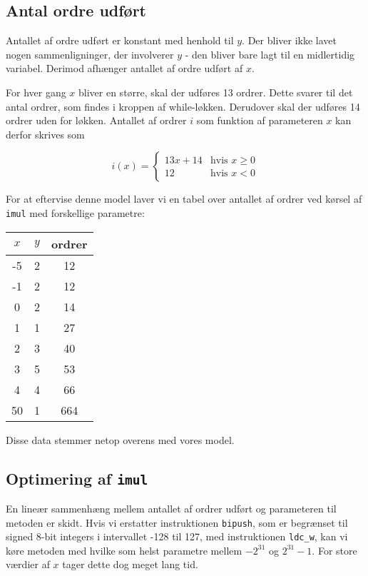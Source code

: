 \documentclass[12pt,a4paper]{article}
\newcommand{\imul}{\texttt{imul}}
\begin{document}
\subsection{Antal ordre udført}
Antallet af ordre udført er konstant med henhold til $y$. Der bliver ikke lavet
nogen sammenligninger, der involverer $y$ - den bliver bare lagt til en
midlertidig variabel. Derimod afhænger antallet af ordre udført af $x$.

For hver gang $x$ bliver en større, skal der udføres 13 ordrer. Dette
svarer til det antal ordrer, som findes i kroppen af while-løkken.
Derudover skal der udføres 14 ordrer uden for løkken.
Antallet af ordrer $i$ som funktion af parameteren $x$ kan derfor
skrives som

\[i(x)=\left\{\begin{array}{cc}
	13x + 14 & \text{hvis }x\geq0 \\
	12 & \text{hvis }x<0
\end{array}\right.\]


For at eftervise denne model laver vi en tabel over antallet af ordrer
ved kørsel af \imul{} med forskellige parametre:

\begin{tabular}{|c|c|c|}
\hline
$x$ & $y$ & ordrer \\ \hline
-5  & 2  &  12 \\ \hline
-1  & 2  &  12 \\ \hline
 0  & 2  &  14 \\ \hline
 1  & 1  &  27 \\ \hline
 2  & 3  &  40 \\ \hline
 3  & 5  &  53 \\ \hline
 4  & 4  &  66 \\ \hline
50  & 1  & 664 \\ \hline
\end{tabular}

Disse data stemmer netop overens med vores model.

\subsection{Optimering af \imul{}}

En lineær sammenhæng mellem antallet af ordrer udført og parameteren til
metoden er skidt. Hvis vi erstatter instruktionen \texttt{bipush}, som er
begrænset til signed 8-bit integers i intervallet -128 til 127, med
instruktionen \texttt{ldc\_w}, kan vi køre metoden med hvilke som helst
parametre mellem $-2^{31}$ og $2^{31}-1$. For store værdier af $x$ tager dette
dog meget lang tid.
\end{document}
